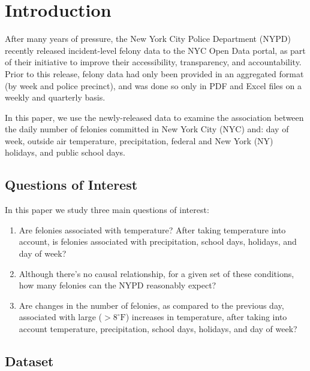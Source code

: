 \documentclass[11pt,notitlepage]{article}
\newcommand{\degf}{^\circ\text{F}}
\begin{document}
\pagebreak

\singlespacing



\section{Introduction}



After many years of pressure, the New York City Police Department (NYPD) recently released incident-level felony data to the NYC Open Data portal, as part of their initiative to improve their accessibility, transparency, and accountability. Prior to this release, felony data had only been provided in an aggregated format (by week and police precinct), and was done so only in PDF and Excel files on a weekly and quarterly basis.

In this paper, we use the newly-released data to examine the association between the daily number of felonies committed in New York City (NYC) and: day of week, outside air temperature, precipitation, federal and New York (NY) holidays, and public school days.

\subsection{Questions of Interest}

In this paper we study three main questions of interest:

\begin{enumerate}
\setlength\itemsep{-1pt}
\item Are felonies associated with temperature? After taking temperature into account, is felonies associated with precipitation, school days, holidays, and day of week?
\item Although there’s no causal relationship, for a given set of these conditions, how many felonies can the NYPD reasonably expect?
\item Are changes in the number of felonies, as compared to the previous day, associated with large ($>8 \degf$) increases in temperature, after taking into account temperature, precipitation, school days, holidays, and day of week?
\end{enumerate}



\subsection{Dataset}
\label{sec:dataset}
\end{document}
